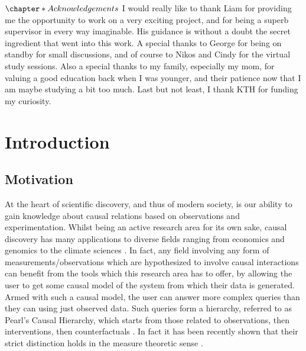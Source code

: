 \documentclass{tufte-book}
\begin{document}
 \newpage 

\(\chapter*{Acknowledgements}\)
I would really like to thank Liam for providing me the opportunity to work on a very exciting project, and for being a superb supervisor in every way imaginable. His guidance is without a doubt the secret ingredient that went into this work. A special thanks to George for being on standby for small discussions, and of course to Nikos and Cindy for the virtual study sessions. Also a special thanks to my family, especially my mom, for valuing a good education back when I was younger, and their patience now that I am maybe studying a bit too much. Last but not least, I thank KTH for funding my curiosity.

 \newpage 


\setcounter{tocdepth}{1}
\tableofcontents

 \newpage 

\chapter{Introduction}
\label{sec:orge3c6435}
\label{sec:Intro}
\section{Motivation}
\label{sec:org2aba2c5}
At the heart of scientific discovery, and thus of modern society, is our ability to gain knowledge about causal relations based on observations and experimentation. Whilst being an active research area for its own sake, causal discovery has many applications to diverse fields ranging from economics  \cite{huang-2019-causal-discov} and genomics \cite{hu-2018-applic-causal} to the climate sciences \cite{runge-2019-infer-causat}. In fact, any field involving any form of measurements/observations which are hypothesized to involve causal interactions can benefit from the tools which this research area has to offer, by allowing the user to get some causal model of the system from which their data is generated. Armed with such a causal model, the user can answer more complex queries than they can using just observed data. Such queries form a hierarchy, referred to as Pearl's Causal Hierarchy, which starts from those related to observations, then interventions, then counterfactuals \cite{pearl-2018-book-why}. In fact it has been recently shown that their strict distinction holds in the measure theoretic sense \cite{elias-2020-pearl-hierar}.
\end{document}
